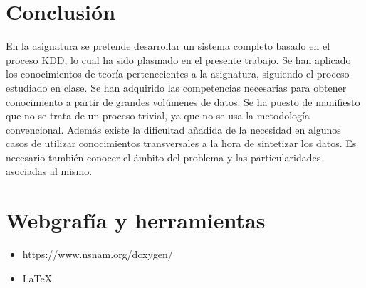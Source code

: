 \documentclass[a4paper,10pt]{article}
\begin{document}
\section{Conclusi\'on}
 En la asignatura se pretende desarrollar un sistema completo basado en el proceso KDD, lo cual ha sido plasmado en el presente trabajo. Se han aplicado los conocimientos de teor\'ia pertenecientes a la asignatura, siguiendo el proceso estudiado en clase. Se han adquirido las competencias necesarias para obtener conocimiento a partir de grandes vol\'umenes de datos.
Se ha puesto de manifiesto que no se trata de un proceso trivial, ya que no se usa la  metodolog\'ia convencional. \singlespacing
Adem\'as existe la dificultad a\~nadida de la necesidad en algunos casos de utilizar conocimientos transversales a la hora de sintetizar los datos. Es necesario tambi\'en conocer el \'ambito del problema y las particularidades asociadas al mismo.

\section{Webgraf\'ia y herramientas}
\begin{itemize}
\item https://www.nsnam.org/doxygen/
\item \LaTeX
\end{itemize}
\end{document}
